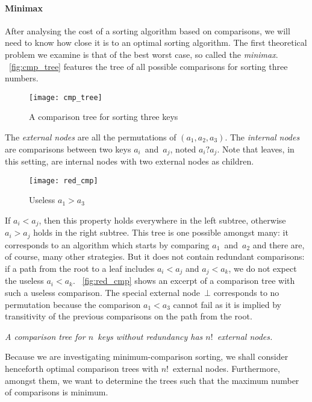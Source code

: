 \paragraph{Minimax}
\label{par:minimax}

After analysing the cost of a sorting algorithm based on comparisons,
we will need to know how close it is to an optimal sorting
algorithm. The first theoretical problem
we examine is that of the best worst case, so called the
\emph{minimax}. \Fig~\vref{fig:cmp_tree}
features the tree of all possible comparisons  for sorting three numbers.
\begin{figure}[t]
\centering
\texttt{[image: cmp\_tree]}
\caption{A comparison tree for sorting three keys}
\label{fig:cmp_tree}
\end{figure}
The \emph{external nodes}\label{def:external_node} are all the
permutations of \((a_1,a_2,a_3)\). The
\emph{internal nodes} are comparisons
between two keys \(a_i\)~and~\(a_j\), noted \(a_i?a_j\). Note that
leaves, in this setting, are internal nodes with two external nodes as
children.
\begin{wrapfigure}[8]{r}[0pt]{0pt}
\centering
\texttt{[image: red\_cmp]}
\caption{Useless \(a_1 > a_3\)}
\label{fig:red_cmp}
\end{wrapfigure}
If \(a_i < a_j\), then this property holds everywhere in the left
subtree, otherwise \(a_i > a_j\) holds in the right subtree. This tree
is one possible amongst many: it corresponds to an algorithm which
starts by comparing \(a_1\)~and~\(a_2\) and there are, of course, many
other strategies. But it does not contain redundant comparisons: if a
path from the root to a leaf includes \(a_i < a_j\) and \(a_j < a_k\),
we do not expect the useless \(a_i < a_k\). \Fig~\vref{fig:red_cmp}
shows an excerpt of a comparison tree with such a useless
comparison. The special external node~\(\bot\) corresponds to no
permutation because the comparison \(a_1 < a_3\) cannot fail as it is
implied by transitivity of the previous comparisons on the path from
the root.
\begin{center}
  \emph{A comparison tree for \(n\)~keys without redundancy has
    \(n!\)~external nodes.}
\end{center}
Because we are investigating minimum\hyp{}comparison sorting, we shall
consider henceforth optimal comparison trees with \(n!\)~external
nodes. Furthermore, amongst them, we want to determine the trees such
that the maximum number of comparisons is minimum.


